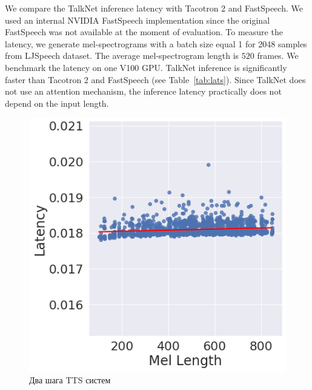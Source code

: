 We compare the TalkNet inference latency with Tacotron 2 and FastSpeech. We used an internal NVIDIA FastSpeech implementation since the original FastSpeech was not available at the moment of evaluation. To measure the latency, we generate mel-spectro\-grams with a batch size equal 1 for 2048  samples from LJSpeech dataset. The average mel-spectrogram length is $520$ frames. We benchmark the latency on one V100 GPU. TalkNet inference is significantly faster than Tacotron 2 and FastSpeech (see Table~\ref{tab:lats}). Since TalkNet  does not use an attention mechanism, the inference latency practically does not depend on the input length.

\begin{table}[!ht]
\centering
{}
\caption{TalkNet inference latency for mel-spectrogram generation (without vocoder). The latency was measured with batch size $1$ using a V100 GPU and averaged over 2048 samples from LJSpeech. Latency and Real-Time-Factor (RTF) with $95\%$ confidence interval.}
\label{tab:lats}
\end{table}

\begin{figure}[!ht]
\centering
\includegraphics[width=1.0\textwidth]{images/len-lat.png}
\caption{Два шага TTS систем}
\label{fig:len-lat}
\end{figure}
